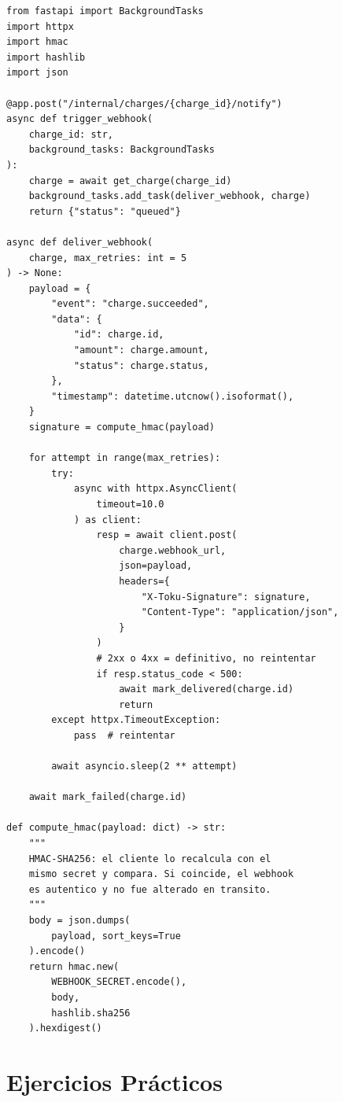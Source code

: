 \documentclass[11pt,a4paper]{article}
\begin{document}
\begin{pybox}
\begin{lstlisting}[style=python]
from fastapi import BackgroundTasks
import httpx
import hmac
import hashlib
import json

@app.post("/internal/charges/{charge_id}/notify")
async def trigger_webhook(
    charge_id: str,
    background_tasks: BackgroundTasks
):
    charge = await get_charge(charge_id)
    background_tasks.add_task(deliver_webhook, charge)
    return {"status": "queued"}

async def deliver_webhook(
    charge, max_retries: int = 5
) -> None:
    payload = {
        "event": "charge.succeeded",
        "data": {
            "id": charge.id,
            "amount": charge.amount,
            "status": charge.status,
        },
        "timestamp": datetime.utcnow().isoformat(),
    }
    signature = compute_hmac(payload)

    for attempt in range(max_retries):
        try:
            async with httpx.AsyncClient(
                timeout=10.0
            ) as client:
                resp = await client.post(
                    charge.webhook_url,
                    json=payload,
                    headers={
                        "X-Toku-Signature": signature,
                        "Content-Type": "application/json",
                    }
                )
                # 2xx o 4xx = definitivo, no reintentar
                if resp.status_code < 500:
                    await mark_delivered(charge.id)
                    return
        except httpx.TimeoutException:
            pass  # reintentar

        await asyncio.sleep(2 ** attempt)

    await mark_failed(charge.id)

def compute_hmac(payload: dict) -> str:
    """
    HMAC-SHA256: el cliente lo recalcula con el
    mismo secret y compara. Si coincide, el webhook
    es autentico y no fue alterado en transito.
    """
    body = json.dumps(
        payload, sort_keys=True
    ).encode()
    return hmac.new(
        WEBHOOK_SECRET.encode(),
        body,
        hashlib.sha256
    ).hexdigest()
\end{lstlisting}
\end{pybox}

\section{Ejercicios Prácticos}
\end{document}

